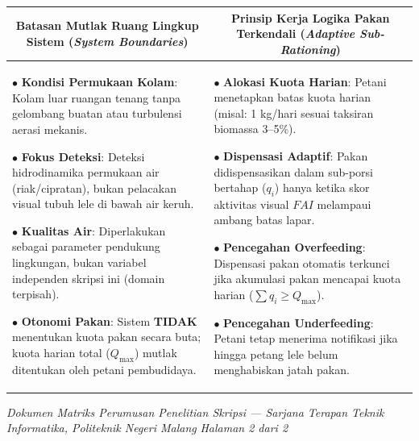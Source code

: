 \documentclass[10pt,a4paper]{article}
\begin{document}
\begin{table}[h!]
\centering
\footnotesize
\renewcommand{\arraystretch}{1.2}
\setlength{\tabcolsep}{6pt}
\begin{tabular}{|p{13.0cm}|p{13.0cm}|}
\hline
\multicolumn{1}{|c|}{\textbf{\color{navy}Batasan Mutlak Ruang Lingkup Sistem (\textit{System Boundaries})}} & 
\multicolumn{1}{c|}{\textbf{\color{navy}Prinsip Kerja Logika Pakan Terkendali (\textit{Adaptive Sub-Rationing})}} \\
\hline
$\bullet$ \textbf{Kondisi Permukaan Kolam}: Kolam luar ruangan tenang tanpa gelombang buatan atau turbulensi aerasi mekanis.\par
$\bullet$ \textbf{Fokus Deteksi}: Deteksi hidrodinamika permukaan air (riak/cipratan), bukan pelacakan visual tubuh lele di bawah air keruh.\par
$\bullet$ \textbf{Kualitas Air}: Diperlakukan sebagai parameter pendukung lingkungan, bukan variabel independen skripsi ini (domain terpisah).\par
$\bullet$ \textbf{Otonomi Pakan}: Sistem \textbf{TIDAK} menentukan kuota pakan secara buta; kuota harian total ($Q_{\max}$) mutlak ditentukan oleh petani pembudidaya. & 
$\bullet$ \textbf{Alokasi Kuota Harian}: Petani menetapkan batas kuota harian (misal: 1 kg/hari sesuai taksiran biomassa 3--5\%).\par
$\bullet$ \textbf{Dispensasi Adaptif}: Pakan didispensasikan dalam sub-porsi bertahap ($q_i$) hanya ketika skor aktivitas visual $FAI$ melampaui ambang batas lapar.\par
$\bullet$ \textbf{Pencegahan Overfeeding}: Dispensasi pakan otomatis terkunci jika akumulasi pakan mencapai kuota harian ($\sum q_i \ge Q_{\max}$).\par
$\bullet$ \textbf{Pencegahan Underfeeding}: Petani tetap menerima notifikasi jika hingga petang lele belum menghabiskan jatah pakan. \\
\hline
\end{tabular}
\end{table}

\vfill
\begin{center}
    \scriptsize \textit{Dokumen Matriks Perumusan Penelitian Skripsi --- Sarjana Terapan Teknik Informatika, Politeknik Negeri Malang} \hfill \textit{Halaman 2 dari 2}
\end{center}
\end{document}
